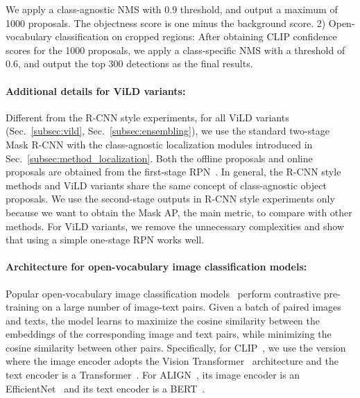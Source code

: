 \documentclass{article} \usepackage{iclr2022_conference,times}
\begin{document}
We apply a class-agnostic NMS with 0.9 threshold, and output a maximum of 1000 proposals. 
The objectness score is one minus the background score.
2) Open-vocabulary classification on cropped regions:
After obtaining CLIP confidence scores for the 1000 proposals, we apply a class-specific NMS with a threshold of 0.6, and output the top 300 detections as the final results.

\paragraph{Additional details for ViLD variants:} Different from the R-CNN style experiments, for all ViLD variants (Sec.~\ref{subsec:vild}, Sec.~\ref{subsec:ensembling}), we use the standard two-stage Mask R-CNN with the class-agnostic localization modules introduced in Sec.~\ref{subsec:method_localization}. Both the  offline proposals and  online proposals are obtained from the first-stage RPN~\citep{ren2015faster}. In general, the R-CNN style methods and ViLD variants share the same concept of class-agnostic object proposals. We use the second-stage outputs in R-CNN style experiments only because we want to obtain the Mask AP, the main metric, to compare with other methods. For ViLD variants, we remove the unnecessary complexities and show that using a simple one-stage RPN works well.
 
\paragraph{Architecture for open-vocabulary image classification models:} Popular open-vocabulary image classification models~\citep{radford2021clip,align} perform contrastive pre-training on a large number of image-text pairs. Given a batch of paired images and texts, the model learns to maximize the cosine similarity between the embeddings of the corresponding image and text pairs, while minimizing the cosine similarity between other pairs. Specifically, for CLIP~\citep{radford2021clip}, we use the version where the image encoder adopts the Vision Transformer~\citep{dosovitskiy2020image} architecture and the text encoder is a Transformer~\citep{vaswani2017attention}. For ALIGN~\citep{align}, its image encoder is an EfficientNet~\citep{tan2019efficientnet} and its text encoder is a BERT~\citep{devlin2018bert}.
\end{document}
